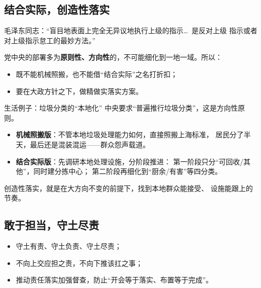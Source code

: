 \documentclass[11pt,a4paper]{ctexart}
\begin{document}
\subsection{结合实际，创造性落实}

\begin{quoteblock}
毛泽东同志：``盲目地表面上完全无异议地执行上级的指示\dots\ 是反对上级
指示或者对上级指示怠工的最妙方法。''
\end{quoteblock}

党中央的部署多为\textbf{原则性、方向性}的，不可能细化到一地一域。所以：

\begin{actionblock}
\begin{itemize}
  \item 既不能机械照搬，也不能借``结合实际''之名打折扣；
  \item 要在大政方针之下，做精做实落实方案。
\end{itemize}
\end{actionblock}

\begin{exampleblock}{生活例子：垃圾分类的``本地化''}
中央要求``普遍推行垃圾分类''，这是方向性原则。
\begin{itemize}
  \item \textbf{机械照搬版}：不管本地垃圾处理能力如何，直接照搬上海标准，
        居民分了半天，最后还是混装混运——群众怨声载道。
  \item \textbf{结合实际版}：先调研本地处理设施，分阶段推进：
        第一阶段只分``可回收/其他''，同时建分拣中心；
        第二阶段再细化到``厨余/有害''等四分类。
\end{itemize}
创造性落实，就是在大方向不变的前提下，找到本地群众能接受、
设施能跟上的节奏。
\end{exampleblock}

\subsection{敢于担当，守土尽责}

\begin{actionblock}
\begin{itemize}
  \item 守土有责、守土负责、守土尽责；
  \item 不向上交应担之责，不向下推该扛之事；
  \item 推动责任落实加强督查，防止``开会等于落实、布置等于完成''。
\end{itemize}
\end{actionblock}
\end{document}
